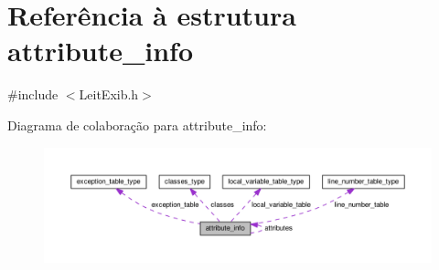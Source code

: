 \hypertarget{structattribute__info}{\section{Referência à estrutura attribute\-\_\-info}
\label{structattribute__info}
}


{\ttfamily \#include $<$Leit\-Exib.\-h$>$}



Diagrama de colaboração para attribute\-\_\-info\-:\nopagebreak
\begin{figure}[H]
\begin{center}
\leavevmode
\includegraphics[width=350pt]{structattribute__info__coll__graph}
\end{center}
\end{figure}
